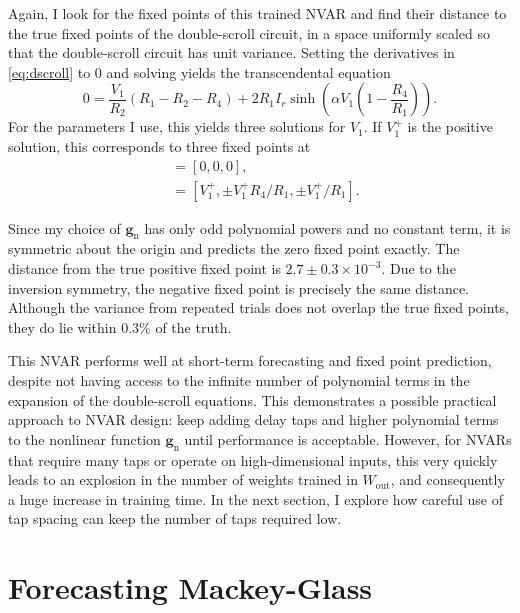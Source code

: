 Again, I look for the fixed points of this trained NVAR and find
their distance to the true fixed points of the double-scroll circuit,
in a space uniformly scaled so that the double-scroll circuit has unit
variance. Setting the derivatives in \cref{eq:dscroll} to $0$
and solving yields the transcendental equation
\begin{equation}
  0 = \frac{V_1}{R_2}(R_1 - R_2 - R_4) + 2 R_1 I_r \sinh\left(\alpha V_1 \left(1 - \frac{R_4}{R_1}\right)\right).
\end{equation}
For the parameters I use, this yields three solutions for $V_1$. If
$V_1^+$ is the positive solution, this corresponds to three fixed points
at
\begin{align}
  [V_1, V_2, I] &= [0, 0, 0], \\
                &= [V_1^+, \pm V_1^+ R_4 / R_1, \pm V_1^+ / R_1].
\end{align}

Since my choice of $\bm{g}_\text{n}$ has only odd polynomial powers
and no constant term, it is symmetric about the origin and predicts
the zero fixed point exactly. The distance from the true positive
fixed point is $2.7\pm0.3\times10^{-3}$. Due to the inversion
symmetry, the negative fixed point is precisely the same
distance. Although the variance from repeated trials does not overlap
the true fixed points, they do lie within $0.3\%$ of the truth.

This NVAR performs well at short-term forecasting and fixed point
prediction, despite not having access to the infinite number of
polynomial terms in the expansion of the double-scroll equations. This
demonstrates a possible practical approach to NVAR design: keep adding
delay taps and higher polynomial terms to the nonlinear function
$\bm{g}_\text{n}$ until performance is acceptable. However, for NVARs
that require many taps or operate on high-dimensional inputs, this
very quickly leads to an explosion in the number of weights trained in
$W_\text{out}$, and consequently a huge increase in training time. In
the next section, I explore how careful use of tap spacing can
keep the number of taps required low.

\section{Forecasting Mackey-Glass}\label{sec:nvar-mackey-glass}


